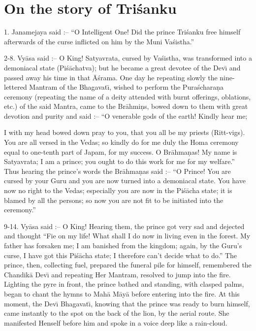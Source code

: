 \chapter{On the story of Tri\'sanku}

1. Janamejaya said :-- ``O Intelligent One! Did the prince Tri\'sanku free himself afterwards of the curse inflicted on him by the Muni Va\'sistha.''

2-8. Vy\=asa said :-- O King! Satyavrata, cursed by Va\'sistha, was transformed into a demoniacal state (Pi\'s\=achatva); but he became a great devotee of the Dev\={\i} and passed away his time in that \=A\'srama. One day he repeating slowly the nine-lettered Mantram of the Bhagavat\={\i}, wished to perform the Pura\'schara\d{n}a ceremony (repeating the name of a deity attended with burnt offerings, oblations, etc.) of the said Mantra, came to the Br\=ahmi\d{n}s, bowed down to them with great devotion and purity and said :-- ``O venerable gods of the earth! Kindly hear me;

I with my head bowed down pray to you, that you all be my priests (Ritt-vigs). You are all versed in the Vedas; so kindly do for me duly the Homa ceremony equal to one-tenth part of Japam, for my success. O Br\=ahma\d{n}as! My name is Satyavrata; I am a prince; you ought to do this work for me for my welfare.'' Thus hearing the prince's words the Br\=ahma\d{n}as said :-- ``O Prince! You are cursed by your Guru and you are now turned into a demoniacal state. You have now no right to the Vedas; especially you are now in the Pi\'s\=acha state; it is blamed by all the persons; so now you are not fit to be initiated into the ceremony.''

9-14. Vy\=asa said :-- O King! Hearing them, the prince got very sad and dejected and thought ``Fie on my life! What shall I do now in living even in the forest. My father has forsaken me; I am banished from the kingdom; again, by the Guru's curse, I have got this Pi\'s\=acha state; I therefore can't decide what to do.'' The prince, then, collecting fuel, prepared the funeral pile for himself, remembered the Chandik\=a Dev\={\i} and repeating Her Mantram, resolved to jump into the fire. Lighting the pyre in front, the prince bathed and standing, with clasped palms, began to chant the hymns to Mah\=a M\=ay\=a before entering into the fire. At this moment, the Dev\={\i} Bhagavat\={\i}, knowing that the prince was ready to burn himself, came instantly to the spot on the back of the lion, by the aerial route. She manifested Henself before him and spoke in a voice deep like a rain-cloud.

